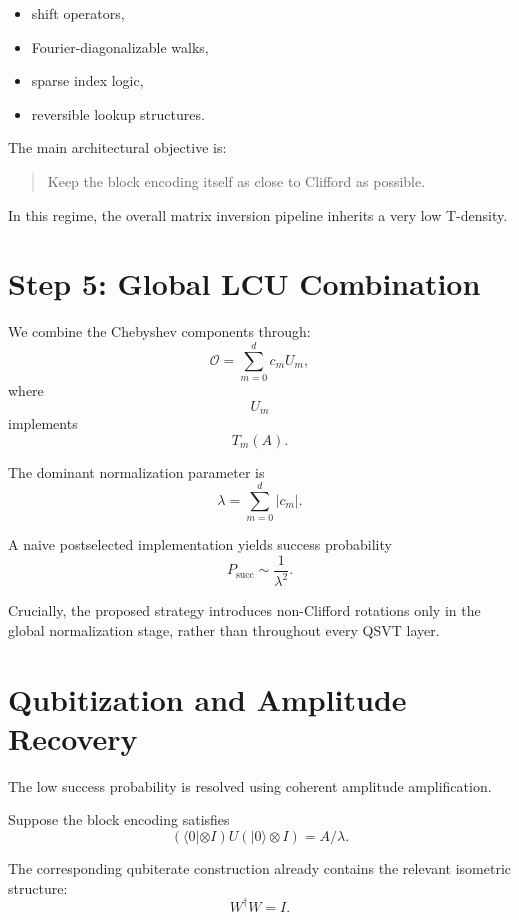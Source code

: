 \documentclass[12pt,a4paper]{article}
\begin{document}
\begin{itemize}
    \item shift operators,
    \item Fourier-diagonalizable walks,
    \item sparse index logic,
    \item reversible lookup structures.
\end{itemize}

The main architectural objective is:

\begin{quote}
Keep the block encoding itself as close to Clifford as possible.
\end{quote}

In this regime, the overall matrix inversion pipeline inherits a very low T-density.


\section{Step 5: Global LCU Combination}

We combine the Chebyshev components through:
\[
\mathcal O
=
\sum_{m=0}^d c_m U_m,
\]
where
\[
U_m
\]
implements
\[
T_m(A).
\]

The dominant normalization parameter is
\[
\lambda
=
\sum_{m=0}^d |c_m|.
\]

A naive postselected implementation yields success probability
\[
P_{\text{succ}}
\sim
\frac{1}{\lambda^2}.
\]

Crucially, the proposed strategy introduces non-Clifford rotations only in the global normalization stage, rather than throughout every QSVT layer.


\section{Qubitization and Amplitude Recovery}

The low success probability is resolved using coherent amplitude amplification.

Suppose the block encoding satisfies
\[
(\langle 0| \otimes I)
U
(|0\rangle \otimes I)
=
A/\lambda.
\]

The corresponding qubiterate construction already contains the relevant isometric structure:
\[
W^\dagger W = I.
\]
\end{document}
